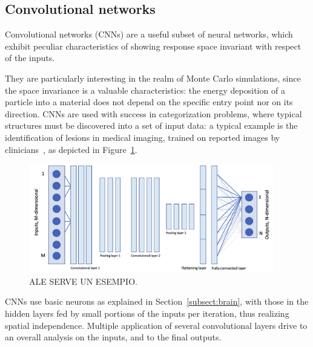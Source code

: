 \subsection{Convolutional networks}
Convolutional networks (CNNs) are a useful subset of neural networks, which exhibit peculiar characteristics of showing  response space invariant with respect of the inputs.

They are particularly interesting in the realm of Monte Carlo simulations, since the space invariance is a valuable characteristics:  
the energy deposition of a particle into a material
does not depend on the specific entry point nor on its direction.
CNNs are used with success in categorization problems, where typical structures must be discovered into a set of input data: a typical example is the identification of lesions in medical imaging, trained on reported images by clinicians~\cite{Anwar2018}, as depicted in Figure~\ref{fig:cnn}.

 \begin{figure}[h]
    \centering
    \hfill
         \includegraphics[width=0.95\textwidth]{images/cnn.png}

     \caption{ALE SERVE UN ESEMPIO.}
     \label{fig:cnn}
\end{figure}

CNNs use basic neurons as explained in Section~\ref{subsect:brain}, with those in the hidden layers fed by small portions of the inputs per iteration, thus realizing spatial independence. Multiple application of several convolutional layers drive to an overall analysis on the inputs, and to the final outputs.

